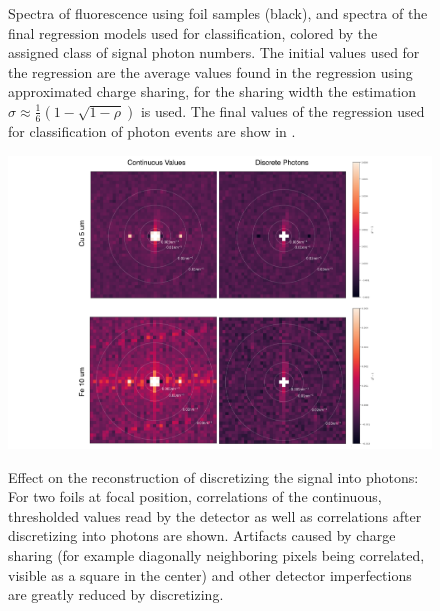 \begin{figure}[h!]
\begin{subfigure}[b]{0.30\textwidth}
	\end{subfigure}
	\caption[Spectra of fluorescence using foil samples with photon number classes]{Spectra of fluorescence using foil samples (black), and spectra of the final regression models used for classification, colored by the assigned class of signal photon numbers. The initial values used for the regression are the average values found in the regression using approximated charge sharing, for the sharing width the estimation $\sigma\approx\frac{1}{6} \left(1-\sqrt{1-\rho }\right)$ is used.  The final values of the regression used for classification of photon events are show in .}
	\label{fig:thresholdsfoil}
\end{figure}
\begin{figure}
	\includegraphics[width=\linewidth]{images/foil_photonmodes.pdf}
	\label{fig:foil_photonmodes}
	\caption[Effect of discretizing the signal into photons]{Effect on the reconstruction of discretizing the signal into photons: For two foils at focal position,  correlations of the continuous, thresholded values read by the detector as well as  correlations after discretizing into photons are shown. Artifacts caused by charge sharing (for example diagonally neighboring pixels being correlated, visible as a square in the center) and other detector imperfections are greatly reduced by discretizing.}
\end{figure}

